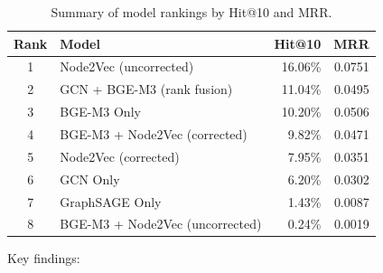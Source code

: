 \documentclass[12pt,a4paper]{article}
\begin{document}
\begin{table}[H]
\centering
\caption{Summary of model rankings by Hit@10 and MRR.}
\label{tab:summary}
\begin{tabular}{clrr}
\toprule
\textbf{Rank} & \textbf{Model} & \textbf{Hit@10} & \textbf{MRR} \\
\midrule
1 & Node2Vec (uncorrected) & 16.06\% & 0.0751 \\
2 & GCN + BGE-M3 (rank fusion) & 11.04\% & 0.0495 \\
3 & BGE-M3 Only & 10.20\% & 0.0506 \\
4 & BGE-M3 + Node2Vec (corrected) & 9.82\% & 0.0471 \\
5 & Node2Vec (corrected) & 7.95\% & 0.0351 \\
6 & GCN Only & 6.20\% & 0.0302 \\
7 & GraphSAGE Only & 1.43\% & 0.0087 \\
8 & BGE-M3 + Node2Vec (uncorrected) & 0.24\% & 0.0019 \\
\bottomrule
\end{tabular}
\end{table}

Key findings:
\end{document}
